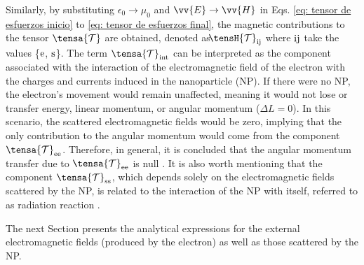 Similarly, by substituting $\epsilon_0 \to \mu_0$ and $\vv{E} \to \vv{H}$ in Eqs. \eqref{eq: tensor de esfuerzos inicio} to \eqref{eq: tensor de esfuerzos final}, the magnetic contributions to the tensor $\tensa{\mathcal{T}}$ are obtained, denoted as $\hspace{-0.6em}\tensH{\mathcal{T}}_{\rm ij}$ where $\rm ij$ take the values \{$\rm e$, $\rm s$\}. The term $\tensa{\mathcal{T}}_{\rm int}$ can be interpreted as the component associated with the interaction of the electromagnetic field of the electron with the charges and currents induced in the nanoparticle (NP). If there were no NP, the electron's movement would remain unaffected, meaning it would not lose or transfer energy, linear momentum, or angular momentum ($\Delta L = 0$). In this scenario, the scattered electromagnetic fields would be zero, implying that the only contribution to the angular momentum would come from the component $\tensa{\mathcal{T}}_{\rm ee}$. Therefore, in general, it is concluded that the angular momentum transfer due to $\tensa{\mathcal{T}}_{\rm ee}$ is null \cite{castellanos2023theory}. It is also worth mentioning that the component $\tensa{\mathcal{T}}_{\rm ss}$, which depends solely on the electromagnetic fields scattered by the NP, is related to the interaction of the NP with itself, referred to as radiation reaction \cite{jackson}.

The next Section presents the analytical expressions for the external electromagnetic fields (produced by the electron) as well as those scattered by the NP.
%
%
